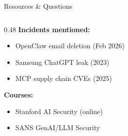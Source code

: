 \documentclass[aspectratio=169,9pt]{beamer}
\begin{document}
\begin{frame}{Resources \& Questions}
\begin{columns}[T]
\begin{column}{0.48\textwidth}
\vspace{0.3em}
\textbf{Incidents mentioned:}
\begin{itemize}\scriptsize
  \item OpenClaw email deletion (Feb 2026)
  \item Samsung ChatGPT leak (2023)
  \item MCP supply chain CVEs (2025)
\end{itemize}

\vspace{0.3em}
\textbf{Courses:}
\begin{itemize}\scriptsize
  \item Stanford AI Security (online)
  \item SANS GenAI/LLM Security
\end{itemize}
\end{column}
\end{columns}
\end{frame}
\end{document}
